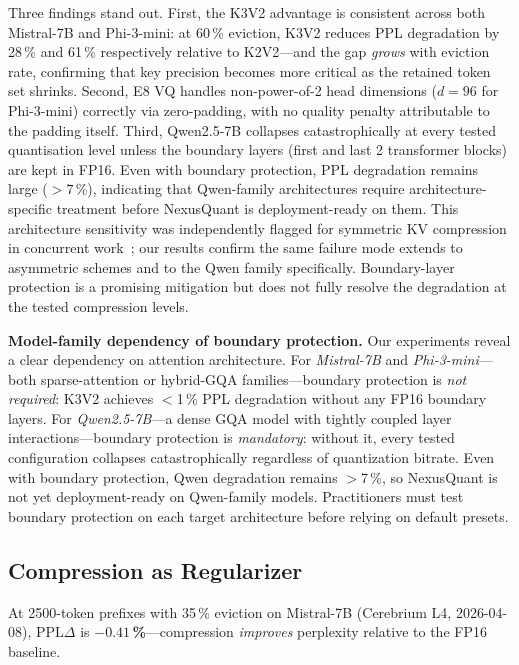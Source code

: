\documentclass{article}
\begin{document}
Three findings stand out.
First, the K3V2 advantage is consistent across both Mistral-7B and Phi-3-mini:
at 60\,\% eviction, K3V2 reduces PPL degradation by 28\,\% and 61\,\% respectively
relative to K2V2---and the gap \emph{grows} with eviction rate, confirming that
key precision becomes more critical as the retained token set shrinks.
Second, E8 VQ handles non-power-of-2 head dimensions ($d=96$ for Phi-3-mini)
correctly via zero-padding, with no quality penalty attributable to the padding itself.
Third, Qwen2.5-7B collapses catastrophically at every tested quantisation
level unless the boundary layers (first and last 2 transformer blocks) are kept
in FP16. Even with boundary protection, PPL degradation remains large ($>7$\,\%),
indicating that Qwen-family architectures require architecture-specific treatment
before NexusQuant is deployment-ready on them.
This architecture sensitivity was independently flagged for symmetric KV
compression in concurrent work~\cite{turboquant_plus2026}; our results confirm
the same failure mode extends to asymmetric schemes and to the Qwen family
specifically. Boundary-layer protection is a promising mitigation but does not
fully resolve the degradation at the tested compression levels.

\textbf{Model-family dependency of boundary protection.}
Our experiments reveal a clear dependency on attention architecture.
For \emph{Mistral-7B} and \emph{Phi-3-mini}---both sparse-attention or
hybrid-GQA families---boundary protection is \emph{not required}: K3V2
achieves $<$1\,\% PPL degradation without any FP16 boundary layers.
For \emph{Qwen2.5-7B}---a dense GQA model with tightly coupled layer
interactions---boundary protection is \emph{mandatory}: without it, every
tested configuration collapses catastrophically regardless of quantization
bitrate. Even with boundary protection, Qwen degradation remains $>$7\,\%,
so NexusQuant is not yet deployment-ready on Qwen-family models.
Practitioners must test boundary protection on each target architecture
before relying on default presets.

\subsection{Compression as Regularizer}
\label{sec:regularizer}

At 2500-token prefixes with 35\,\% eviction on Mistral-7B (Cerebrium L4,
2026-04-08), PPL$\Delta$ is $\mathbf{-0.41}$\,\textbf{\%}---compression
\emph{improves} perplexity relative to the FP16 baseline.
\end{document}
